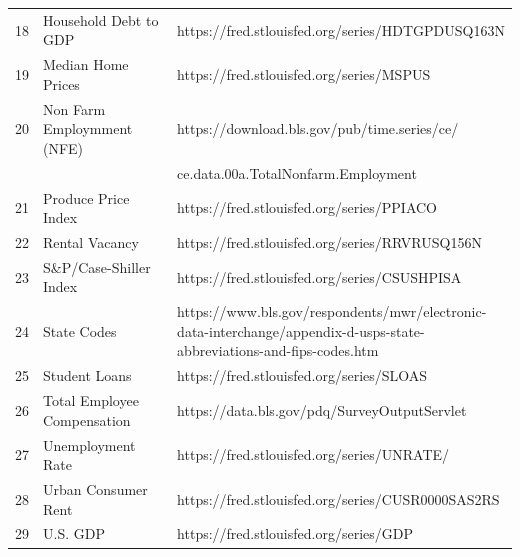\documentclass[sigconf,nonacm,11pt]{acmart}
\begin{document}
\begin{appendix}
\begin{table}[ht]
\begin{tabular}{p{0.05\linewidth}p{0.35\linewidth}p{0.6\linewidth}}
18 & Household Debt to GDP & https://fred.stlouisfed.org/series/HDTGPDUSQ163N\\
19 & Median Home Prices & https://fred.stlouisfed.org/series/MSPUS\\
20 & Non Farm Employmment (NFE) & https://download.bls.gov/pub/time.series/ce/\\
 & & ce.data.00a.TotalNonfarm.Employment\\
21 & Produce Price Index  & https://fred.stlouisfed.org/series/PPIACO\\
22 & Rental Vacancy & https://fred.stlouisfed.org/series/RRVRUSQ156N\\
23 & S\&P/Case-Shiller Index & https://fred.stlouisfed.org/series/CSUSHPISA\\
24 & State Codes & https://www.bls.gov/respondents/mwr/electronic-data-interchange/appendix-d-usps-state-abbreviations-and-fips-codes.htm\\
25 & Student Loans & https://fred.stlouisfed.org/series/SLOAS\\
26 & Total Employee Compensation & https://data.bls.gov/pdq/SurveyOutputServlet\\
27 & Unemployment Rate & https://fred.stlouisfed.org/series/UNRATE/\\
28 & Urban Consumer Rent & https://fred.stlouisfed.org/series/CUSR0000SAS2RS\\
29 & U.S. GDP  & https://fred.stlouisfed.org/series/GDP\\
\hline
\end{tabular}
\end{table}

\end{appendix}




\end{document}
